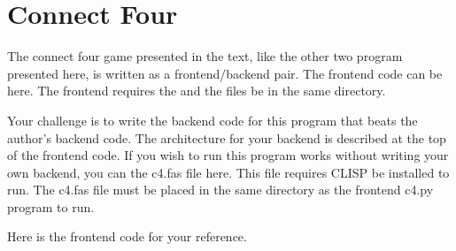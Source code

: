 \documentclass[letterpaper,10pt,english]{sphinxmanual}
\begin{document}
\begin{sphinxVerbatim}[commandchars=\\\{\},numbers=left,firstnumber=1,stepnumber=1]
 
      
      

    
   
    
    
\end{sphinxVerbatim}


\section{Connect Four}
\label{\detokenize{chap12/chap12:connect-four}}
The connect four game presented in the text, like the other two program presented here, is written as a front\sphinxhyphen{}end/back\sphinxhyphen{}end pair. The front\sphinxhyphen{}end code can be  here. The front\sphinxhyphen{}end requires the  and the  files be in the same directory.

Your challenge is to write the back\sphinxhyphen{}end code for this program that beats the author’s back\sphinxhyphen{}end code. The architecture for your back\sphinxhyphen{}end is described at the top of the front\sphinxhyphen{}end code.
If you wish to run this program works without writing your own back\sphinxhyphen{}end, you can  the c4.fas file here. This file requires CLISP be installed to run. The c4.fas file must be placed in the same directory as the front\sphinxhyphen{}end c4.py program to run.

Here is the front\sphinxhyphen{}end code for your reference.
\end{document}
